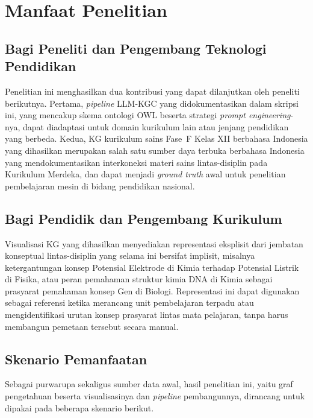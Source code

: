 \documentclass[../../thesis]{subfiles}
\begin{document}
\section{Manfaat Penelitian}

\subsection{Bagi Peneliti dan Pengembang Teknologi Pendidikan}

Penelitian ini menghasilkan dua kontribusi yang dapat dilanjutkan oleh peneliti
berikutnya. Pertama, \textit{pipeline} LLM-KGC yang didokumentasikan dalam
skripsi ini, yang mencakup skema ontologi OWL beserta strategi
\textit{prompt engineering}-nya, dapat diadaptasi untuk domain kurikulum lain
atau jenjang pendidikan yang berbeda. Kedua, KG kurikulum sains Fase~F Kelas XII berbahasa Indonesia
yang dihasilkan merupakan salah satu sumber daya terbuka berbahasa Indonesia yang
mendokumentasikan interkoneksi materi sains lintas-disiplin pada Kurikulum Merdeka,
dan dapat menjadi \textit{ground truth} awal untuk penelitian pembelajaran mesin di
bidang pendidikan nasional.

\subsection{Bagi Pendidik dan Pengembang Kurikulum}

Visualisasi KG yang dihasilkan menyediakan representasi eksplisit dari jembatan
konseptual lintas-disiplin yang selama ini bersifat implisit, misalnya
ketergantungan konsep Potensial Elektrode di Kimia terhadap Potensial Listrik di
Fisika, atau peran pemahaman struktur kimia DNA di Kimia sebagai prasyarat
pemahaman konsep Gen di Biologi. Representasi ini dapat digunakan sebagai referensi ketika
merancang unit pembelajaran terpadu atau mengidentifikasi urutan konsep prasyarat
lintas mata pelajaran, tanpa harus membangun pemetaan tersebut secara manual.

\subsection{Skenario Pemanfaatan}

Sebagai purwarupa sekaligus sumber data awal, hasil penelitian ini, yaitu graf
pengetahuan beserta visualisasinya dan \textit{pipeline} pembangunnya, dirancang
untuk dipakai pada beberapa skenario berikut.
\end{document}
